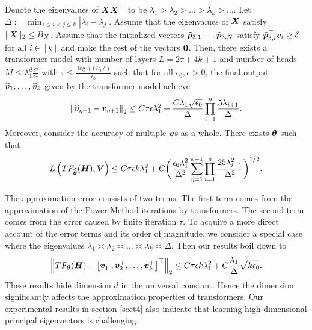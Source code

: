 \begin{theorem}\label{thm3.1} Denote the eigenvalues of $\boldsymbol{X}\boldsymbol{X}^\top$ to be $\lambda_1>\lambda_2>\ldots>\lambda_k>\ldots$. Let $\Delta:=\min_{1\leq i<j\leq k}|\lambda_i-\lambda_j|$. Assume that the eigenvalues of $\boldsymbol{X}$ satisfy $\Vert\boldsymbol{X}\Vert_2\leq B_X$. Assume that the initialized vectors $\tilde{\boldsymbol{p}}_{3,1},\ldots\tilde{\boldsymbol{p}}_{3,N}$ 
    satisfy  $\tilde{\boldsymbol{p}}_{3,i}^\top\boldsymbol{v}_{i}\geq\delta$ for all $i\in[k]$ and make the rest of the vectors $\boldsymbol{0}$. 
    Then, there exists a transformer model with number of layers $L=2\tau+4k+1$ and number of heads $M\leq \lambda_1^d\frac{C}{\epsilon^2}$ with $\tau\leq\frac{\log(1/\epsilon_0\delta)}{\epsilon_0}$ such that for all $\epsilon_0,\epsilon>0$,
    the final output $\widehat{\boldsymbol{v}}_1,\ldots,\widehat{\boldsymbol{v}}_{k}$ given by the transformer model achieve
    \begin{align*}
        \left\Vert\widehat{\boldsymbol{v}}_{\eta+1}-\boldsymbol{v}_{\eta+1}\right\Vert_2\leq C\tau \epsilon\lambda_1^2+\frac{C\lambda_1\sqrt{\epsilon_0}}{\Delta}\prod_{i=1}^{\eta}\frac{5\lambda_{i+1}}{\Delta}.
    \end{align*} 
    Moreover, consider the accuracy of multiple $\boldsymbol{v}$s as a whole. There exists $\boldsymbol{\theta}$ such that 
    \begin{align*}
        L\left(TF_{\widehat{\boldsymbol{\theta}}}(\boldsymbol{H}),\boldsymbol{V}\right)\leq C\tau\epsilon k\lambda_1^2+C{\bigg (}\frac{\epsilon_0\lambda_1^2}{\Delta^2}\sum_{\eta=1}^{k-1}\prod_{i=1}^{\eta}\frac{25\lambda_{i+1}^2}{\Delta^2}{\bigg )}^{1/2}.
    \end{align*}
\end{theorem}
\begin{remark}
\label{remark3}
    The approximation error consists of two terms. The first term comes from the approximation of the Power Method iterations by transformers. The second term comes from the error caused by finite iteration $\tau$. To acquire a more direct account of the error terms and its order of magnitude, we consider a special case where the eigenvalues $\lambda_1\asymp\lambda_2\asymp\ldots\asymp\lambda_k\asymp\Delta$. Then our results boil down to 
    \begin{align*}
        \left\Vert TF_{\boldsymbol{\theta}}(\boldsymbol{H})-\begin{bmatrix}
            \boldsymbol{v}_1^\top,\boldsymbol{v}_2^\top,\ldots,\boldsymbol{v}_k^\top
        \end{bmatrix}^\top\right\Vert_2\leq C\tau\epsilon k \lambda_1^2+ C\frac{\lambda_1}{\Delta}\sqrt{k\epsilon_0}.
    \end{align*}
    These results hide dimension $d$ in the universal constant. Hence the dimension significantly affects the approximation properties of transformers. Our experimental results in section \ref{sect4} also indicate that learning high dimensional principal eigenvectors is challenging.
\end{remark}

